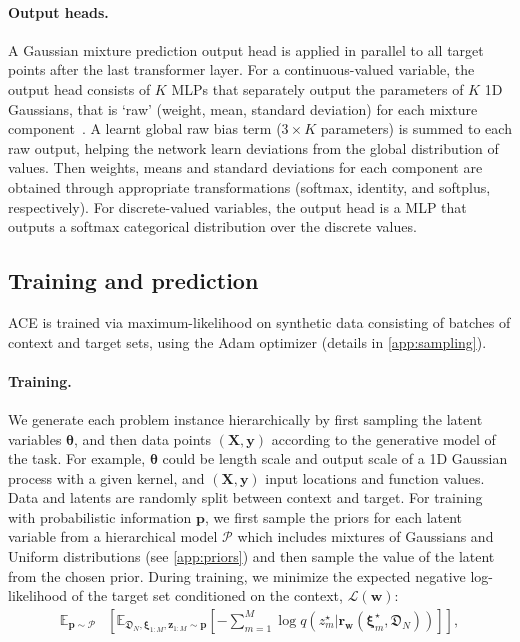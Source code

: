 \documentclass[twoside]{article}
\renewcommand{\r}{\mathbf{r}}
\newcommand{\vtheta}{{\bm{\theta}}}
\newcommand{\vxi}{\bm{\xi}}
\newcommand{\y}{\mathbf{y}}
\newcommand{\z}{\mathbf{z}}
\newcommand{\X}{\mathbf{X}}
\newcommand{\dataplus}{\mathfrak{D}} %
\begin{document}
\paragraph{Output heads.} 
A Gaussian mixture prediction output head is applied in parallel to all target points after the last transformer layer. For a continuous-valued variable, the output head consists of $K$ MLPs that separately output the parameters of $K$ 1D Gaussians, that is `raw' (weight, mean, standard deviation) for each mixture component~\citep{uria2016neural}. A learnt global raw bias term ($3 \times K$ parameters) is summed to each raw output, helping the network learn deviations from the global distribution of values. Then weights, means and standard deviations for each component are obtained through appropriate transformations (softmax, identity, and softplus, respectively). For discrete-valued variables, the output head is a MLP that outputs a softmax categorical distribution over the discrete values.


\subsection{Training and prediction}
\label{sec:training}

\vspace{-0.25em}
ACE is trained via maximum-likelihood on synthetic data consisting of batches of context and target sets, using the Adam optimizer (details in \cref{app:sampling}).

\vspace{-0.25em}
\paragraph{Training.}
We generate each problem instance hierarchically by first sampling the latent variables $\vtheta$, and then data points $(\X, \y)$ according to the generative model of the task. For example, $\vtheta$ could be length scale and output scale of a 1D Gaussian process with a given kernel, and $(\X, \y)$ input locations and function values. Data and latents are randomly split between context and target. For training with probabilistic information $\mathbf{p}$, we first sample the priors for each latent variable from a hierarchical model $\mathcal{P}$ which includes mixtures of Gaussians and Uniform distributions (see \cref{app:priors}) and then sample the value of the latent from the chosen prior. During training, we minimize the expected negative log-likelihood of the target set conditioned on the context, $\mathcal{L}\left(\textbf{w}\right)$:
\begin{equation} 
\label{eq:loss}
\begin{split}
\mathbb{E}_\mathcal{\mathbf{p} \sim P} &\left[ \mathbb{E}_{\dataplus_N, \vxi_{1:M},\z_{1:M} \sim \mathbf{p}}\left[-\sum_{m=1}^M \log q\left(z^\star_m|\r_\textbf{w}(\vxi^\star_m, \dataplus_N)\right) \right] \right],
\end{split}
\end{equation}
\vspace{-1.75em}
\end{document}
